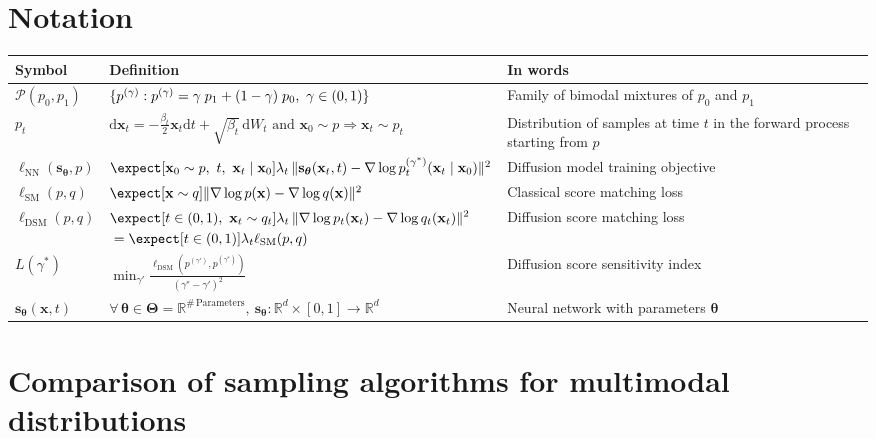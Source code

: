 \documentclass[11pt]{article}
\newcommand{\vect}[1]{\mathbf{#1}}
\newcommand{\RR}{\mathbb{R}}
\theoremstyle{plain}
\newcommand{\1}{\mathbbm{1}}
\DeclarePairedDelimiter{\norm}{\lVert}{\rVert}
\DeclarePairedDelimiter{\set}{\lbrace}{\rbrace}
\newcommand{\btheta}{{\boldsymbol{\theta}}}
\newcommand{\vx}{\vect{x}}
\newcommand{\vs}{\vect{s}}
\newcommand{\ldsm}{\ell_\mathrm{DSM}}
\newcommand{\lsm}{\ell_\mathrm{SM}}
\newcommand{\lnn}{\ell_{\mathrm{NN}}}
\newcommand{\pdist}[2][]{p_{#1}^{(#2)}}
\begin{document}
\newpage 
\begin{appendices}

\section{Notation}

{\renewcommand{\arraystretch}{1.5}
\begin{tabular}{ |p{15mm}| p{77mm}| p{35mm} |}
\hline
 Symbol & Definition & In words
 \\
 \hline
 $\mathcal{P}(p_0, p_1)$ 
 & 
 $\set{\pdist{\gamma}: \pdist{\gamma} = \gamma \; p_1+(1-\gamma) \; p_0,\ \gamma \in (0,1)}$ 
 & 
 Family of bimodal mixtures of $p_0$ and $p_1$
 \\
 \hline
 $p_t$ 
 & 
 $\mathrm{d} \vx_t = -\frac{\beta_t}{2} \vx_t \mathrm{d}t + \sqrt{\beta_t}\, \mathrm{d}W_t \text{ and } \vx_0 \sim p \Longrightarrow \vx_t \sim p_t$
 & 
 Distribution of samples at time $t$ in the forward process starting from $p$
 \\
 \hline
 $\lnn(\vs_\btheta, p)$ 
 & 
 $\expect[{ \vx_0 \sim p,\ t,\ \vx_t \mid \vx_0}]{\lambda_t\, \norm{\vs_\btheta(\vx_t, t) - \nabla \log \pdist[t]{\gamma^{*}}(\vx_t \mid \vx_0)}^2}$ 
 & 
 Diffusion model training objective
 \\
 \hline
 $\lsm(p,q)$ 
 & 
 $\expect[{\vx \sim q}]{\norm{\nabla \log p(\vx) - \nabla \log q(\vx)}^2}$ 
 & 
 Classical score matching loss
 \\
 \hline
 $\ldsm(p,q)$ 
 & 
 $\begin{aligned}[t]
   &\expect[{t \in (0,1),\ \vx_t \sim q_t}]{\lambda_t\, \norm{\nabla \log p_t(\vx_t) - \nabla \log q_t(\vx_t)}^2} \\
   &=\expect[{t \in (0,1)}]{\lambda_t\lsm(p,q)}
 \end{aligned}$ 
 & 
 Diffusion score matching loss
 \\
 \hline
 $L(\gamma^*)$ 
 & 
 $\displaystyle \min_{\gamma'} \frac{\ldsm(\pdist{\gamma'},\pdist{\gamma^*})}{(\gamma^* - \gamma')^2}$
 & 
 Diffusion score sensitivity index
 \\
 \hline
 $\vs_\btheta(\vx, t)$ 
 & 
 $\forall\, \btheta \in \bm{\Theta} = \RR^{\#\,\text{Parameters}},\ \vs_\btheta : \RR^d \times [0,1] \rightarrow \RR^d$ 
 & 
 Neural network with parameters $\btheta$
 \\
 \hline
\end{tabular}
}


\section{Comparison of sampling algorithms for multimodal distributions}



\end{appendices}
\end{document}
